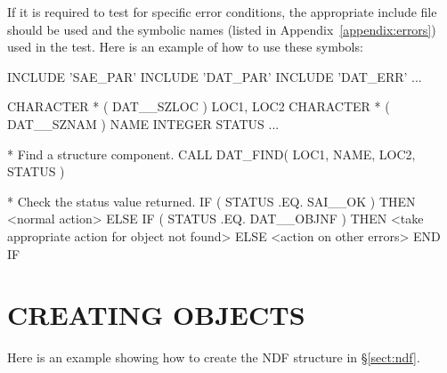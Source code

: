 \documentclass[twoside,11pt]{starlink}
\begin{document}
If it is required to test for specific error conditions, the
appropriate include file should be used and the symbolic names (listed
in Appendix~\ref{appendix:errors}) used in the test. Here is an
example of how to use these symbols:

\begin{small}
\begin{terminalv}
      INCLUDE 'SAE_PAR'
      INCLUDE 'DAT_PAR'
      INCLUDE 'DAT_ERR'
      ...

      CHARACTER * ( DAT__SZLOC ) LOC1, LOC2
      CHARACTER * ( DAT__SZNAM ) NAME
      INTEGER STATUS
      ...

* Find a structure component.
      CALL DAT_FIND( LOC1, NAME, LOC2, STATUS )

* Check the status value returned.
      IF ( STATUS .EQ. SAI__OK ) THEN
         <normal action>
      ELSE IF ( STATUS .EQ. DAT__OBJNF ) THEN
         <take appropriate action for object not found>
      ELSE
         <action on other errors>
      END IF
\end{terminalv}
\end{small}

\section{\label{sect:creating}CREATING OBJECTS}

Here is an example showing how to create the NDF structure in
\S\ref{sect:ndf}.
\end{document}
